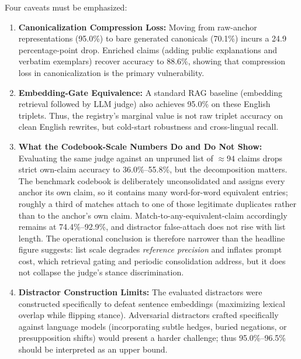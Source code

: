 \documentclass{article}
\begin{document}
Four caveats must be emphasized:

\begin{enumerate}
\item \textbf{Canonicalization Compression Loss:} Moving from raw-anchor representations (95.0\%) to bare generated canonicals (70.1\%) incurs a 24.9 percentage-point drop. Enriched claims (adding public explanations and verbatim exemplars) recover accuracy to 88.6\%, showing that compression loss in canonicalization is the primary vulnerability.

\item \textbf{Embedding-Gate Equivalence:} A standard RAG baseline (embedding retrieval followed by LLM judge) also achieves 95.0\% on these English triplets. Thus, the registry's marginal value is not raw triplet accuracy on clean English rewrites, but cold-start robustness and cross-lingual recall.

\item \textbf{What the Codebook-Scale Numbers Do and Do Not Show:} Evaluating the same judge against an unpruned list of $\approx 94$ claims drops strict own-claim accuracy to 36.0\%--55.8\%, but the decomposition matters. The benchmark codebook is deliberately unconsolidated and assigns every anchor its own claim, so it contains many word-for-word equivalent entries; roughly a third of matches attach to one of those legitimate duplicates rather than to the anchor's own claim. Match-to-any-equivalent-claim accordingly remains at 74.4\%--92.9\%, and distractor false-attach does not rise with list length. The operational conclusion is therefore narrower than the headline figure suggests: list scale degrades \emph{reference precision} and inflates prompt cost, which retrieval gating and periodic consolidation address, but it does not collapse the judge's stance discrimination.

\item \textbf{Distractor Construction Limits:} The evaluated distractors were constructed specifically to defeat sentence embeddings (maximizing lexical overlap while flipping stance). Adversarial distractors crafted specifically against language models (incorporating subtle hedges, buried negations, or presupposition shifts) would present a harder challenge; thus 95.0\%--96.5\% should be interpreted as an upper bound.
\end{enumerate}
\end{document}
